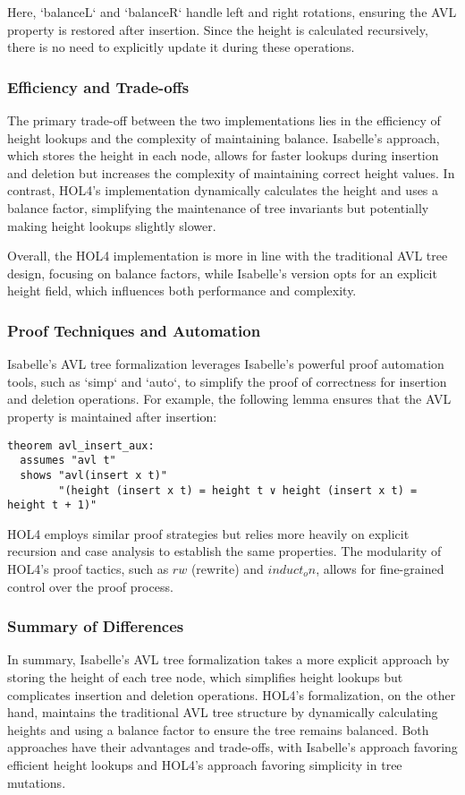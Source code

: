 \documentclass[12pt]{article}
\begin{document}
\begin{itemize}
Here, `balanceL` and `balanceR` handle left and right rotations, ensuring the AVL property is restored after insertion. Since the height is calculated recursively, there is no need to explicitly update it during these operations.

\subsubsection{Efficiency and Trade-offs}

The primary trade-off between the two implementations lies in the efficiency of height lookups and the complexity of maintaining balance. Isabelle's approach, which stores the height in each node, allows for faster lookups during insertion and deletion but increases the complexity of maintaining correct height values. In contrast, HOL4’s implementation dynamically calculates the height and uses a balance factor, simplifying the maintenance of tree invariants but potentially making height lookups slightly slower.

Overall, the HOL4 implementation is more in line with the traditional AVL tree design, focusing on balance factors, while Isabelle’s version opts for an explicit height field, which influences both performance and complexity.

\subsubsection{Proof Techniques and Automation}
Isabelle’s AVL tree formalization leverages Isabelle’s powerful proof automation tools, such as `simp` and `auto`, to simplify the proof of correctness for insertion and deletion operations. For example, the following lemma ensures that the AVL property is maintained after insertion:

\begin{verbatim}
theorem avl_insert_aux:
  assumes "avl t"
  shows "avl(insert x t)"
        "(height (insert x t) = height t ∨ height (insert x t) = height t + 1)"
\end{verbatim}

HOL4 employs similar proof strategies but relies more heavily on explicit recursion and case analysis to establish the same properties. The modularity of HOL4’s proof tactics, such as \(rw\) (rewrite) and \(induct_on\), allows for fine-grained control over the proof process.

\subsubsection{Summary of Differences}
In summary, Isabelle’s AVL tree formalization takes a more explicit approach by storing the height of each tree node, which simplifies height lookups but complicates insertion and deletion operations. HOL4’s formalization, on the other hand, maintains the traditional AVL tree structure by dynamically calculating heights and using a balance factor to ensure the tree remains balanced. Both approaches have their advantages and trade-offs, with Isabelle’s approach favoring efficient height lookups and HOL4’s approach favoring simplicity in tree mutations.


\end{itemize}
\end{document}
